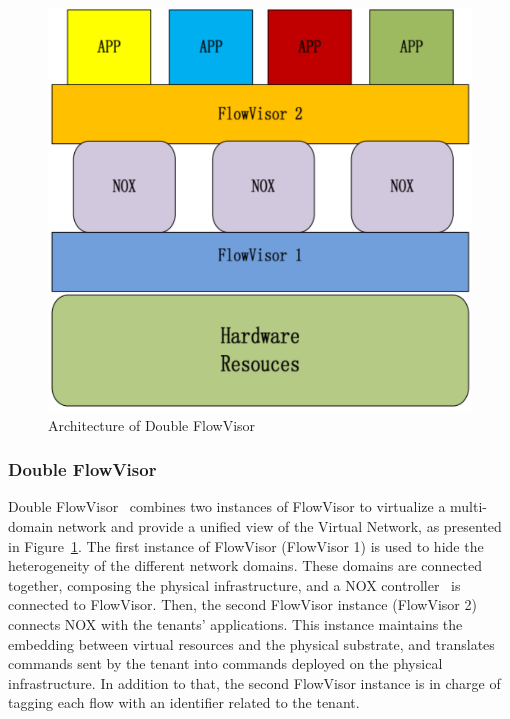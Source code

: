 \begin{figure}[ht]
    \centering
    \includegraphics[scale=0.6]{figures/double_fv.pdf}
    \caption{Architecture of Double FlowVisor~\cite{DoubleFV-Yin2013}}
    \label{fig:double-fv}
\end{figure}

\subsubsection{Double FlowVisor}
Double FlowVisor~\cite{DoubleFV-Yin2013} combines two instances of FlowVisor to virtualize a multi-domain network and provide a unified view of the Virtual Network, as presented in Figure~\ref{fig:double-fv}. The first instance of FlowVisor (FlowVisor 1) is used to hide the heterogeneity of the different network domains. These domains are connected together, composing the physical infrastructure, and a NOX controller~\cite{nox-gude2008} is connected to FlowVisor.
Then, the second FlowVisor instance (FlowVisor 2) connects NOX with the tenants' applications. This instance maintains the embedding between virtual resources and the physical substrate, and translates commands sent by the tenant into commands deployed on the physical infrastructure. In addition to that, the second FlowVisor instance is in charge of tagging each flow with an identifier related to the tenant.

